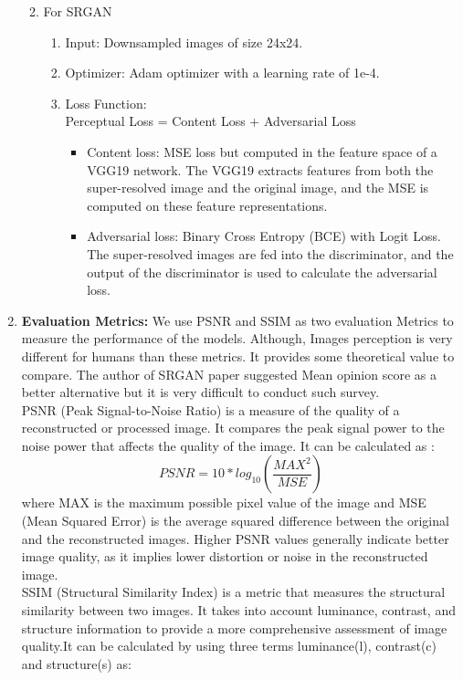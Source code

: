 \begin{enumerate}
\begin{enumerate}
\begin{enumerate}
        \end{enumerate}
        \item For SRGAN
        \begin{enumerate}
            \item Input: Downsampled images of size 24x24.
            \item Optimizer: Adam optimizer with a learning rate of 1e-4.
            \item Loss Function: \\
            Perceptual Loss = Content Loss + Adversarial Loss
            \begin{itemize}
                \item Content loss: MSE loss but computed in the feature space of a VGG19 network. The VGG19 extracts features from both the super-resolved image and the original image, and the MSE is computed on these feature representations.
                \item Adversarial loss: Binary Cross Entropy (BCE) with Logit Loss. The super-resolved images are fed into the discriminator, and the output of the discriminator is used to calculate the adversarial loss.
            \end{itemize}
        \end{enumerate}
    \end{enumerate}
    \item {\bf Evaluation Metrics:} We use PSNR and SSIM as two evaluation Metrics to measure the performance of the models. Although, Images perception is very different for humans than these metrics. It provides some theoretical value to compare. The author of SRGAN paper suggested Mean opinion score as a better alternative but it is very difficult to conduct such survey.\\
    PSNR (Peak Signal-to-Noise Ratio) is a measure of the quality of a reconstructed or processed image. It compares the peak signal power to the noise power that affects the quality of the image. It can be calculated as :
    $$PSNR = 10*log_{10}(\frac{MAX^{2}}{MSE})$$
    where MAX is the maximum possible pixel value of the image and MSE (Mean Squared Error) is the average squared difference between the original and the reconstructed images. Higher PSNR values generally indicate better image quality, as it implies lower distortion or noise in the reconstructed image.\\
    SSIM (Structural Similarity Index) is a metric that measures the structural similarity between two images. It takes into account luminance, contrast, and structure information to provide a more comprehensive assessment of image quality.It can be calculated by using three terms luminance(l), contrast(c) and structure(s) as:

\end{enumerate}

